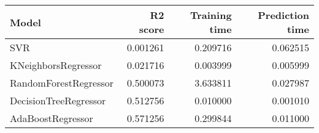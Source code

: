 \begin{tabular}{lrrr}
\toprule
Model & R2 score & Training time & Prediction time \\
\midrule
SVR & 0.001261 & 0.209716 & 0.062515 \\
KNeighborsRegressor & 0.021716 & 0.003999 & 0.005999 \\
RandomForestRegressor & 0.500073 & 3.633811 & 0.027987 \\
DecisionTreeRegressor & 0.512756 & 0.010000 & 0.001010 \\
AdaBoostRegressor & 0.571256 & 0.299844 & 0.011000 \\
\bottomrule
\end{tabular}

